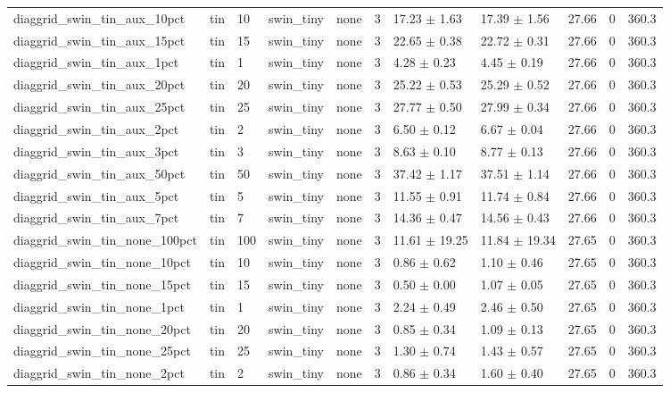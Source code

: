 \begin{tabular}{lllllllllll}
diaggrid_swin_tin_aux_10pct & tin & 10 & swin_tiny & none & 3 & 17.23 $\pm$ 1.63 & 17.39 $\pm$ 1.56 & 27.66 & 0 & 360.3 \\
diaggrid_swin_tin_aux_15pct & tin & 15 & swin_tiny & none & 3 & 22.65 $\pm$ 0.38 & 22.72 $\pm$ 0.31 & 27.66 & 0 & 360.3 \\
diaggrid_swin_tin_aux_1pct & tin & 1 & swin_tiny & none & 3 & 4.28 $\pm$ 0.23 & 4.45 $\pm$ 0.19 & 27.66 & 0 & 360.3 \\
diaggrid_swin_tin_aux_20pct & tin & 20 & swin_tiny & none & 3 & 25.22 $\pm$ 0.53 & 25.29 $\pm$ 0.52 & 27.66 & 0 & 360.3 \\
diaggrid_swin_tin_aux_25pct & tin & 25 & swin_tiny & none & 3 & 27.77 $\pm$ 0.50 & 27.99 $\pm$ 0.34 & 27.66 & 0 & 360.3 \\
diaggrid_swin_tin_aux_2pct & tin & 2 & swin_tiny & none & 3 & 6.50 $\pm$ 0.12 & 6.67 $\pm$ 0.04 & 27.66 & 0 & 360.3 \\
diaggrid_swin_tin_aux_3pct & tin & 3 & swin_tiny & none & 3 & 8.63 $\pm$ 0.10 & 8.77 $\pm$ 0.13 & 27.66 & 0 & 360.3 \\
diaggrid_swin_tin_aux_50pct & tin & 50 & swin_tiny & none & 3 & 37.42 $\pm$ 1.17 & 37.51 $\pm$ 1.14 & 27.66 & 0 & 360.3 \\
diaggrid_swin_tin_aux_5pct & tin & 5 & swin_tiny & none & 3 & 11.55 $\pm$ 0.91 & 11.74 $\pm$ 0.84 & 27.66 & 0 & 360.3 \\
diaggrid_swin_tin_aux_7pct & tin & 7 & swin_tiny & none & 3 & 14.36 $\pm$ 0.47 & 14.56 $\pm$ 0.43 & 27.66 & 0 & 360.3 \\
diaggrid_swin_tin_none_100pct & tin & 100 & swin_tiny & none & 3 & 11.61 $\pm$ 19.25 & 11.84 $\pm$ 19.34 & 27.65 & 0 & 360.3 \\
diaggrid_swin_tin_none_10pct & tin & 10 & swin_tiny & none & 3 & 0.86 $\pm$ 0.62 & 1.10 $\pm$ 0.46 & 27.65 & 0 & 360.3 \\
diaggrid_swin_tin_none_15pct & tin & 15 & swin_tiny & none & 3 & 0.50 $\pm$ 0.00 & 1.07 $\pm$ 0.05 & 27.65 & 0 & 360.3 \\
diaggrid_swin_tin_none_1pct & tin & 1 & swin_tiny & none & 3 & 2.24 $\pm$ 0.49 & 2.46 $\pm$ 0.50 & 27.65 & 0 & 360.3 \\
diaggrid_swin_tin_none_20pct & tin & 20 & swin_tiny & none & 3 & 0.85 $\pm$ 0.34 & 1.09 $\pm$ 0.13 & 27.65 & 0 & 360.3 \\
diaggrid_swin_tin_none_25pct & tin & 25 & swin_tiny & none & 3 & 1.30 $\pm$ 0.74 & 1.43 $\pm$ 0.57 & 27.65 & 0 & 360.3 \\
diaggrid_swin_tin_none_2pct & tin & 2 & swin_tiny & none & 3 & 0.86 $\pm$ 0.34 & 1.60 $\pm$ 0.40 & 27.65 & 0 & 360.3 \\

\end{tabular}

